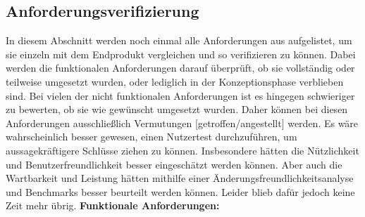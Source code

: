 \subsection{Anforderungsverifizierung}%
%
In diesem Abschnitt werden noch einmal alle Anforderungen aus  aufgelistet, um sie einzeln mit dem Endprodukt vergleichen und so verifizieren zu können. %
Dabei werden die funktionalen Anforderungen darauf überprüft, ob sie vollständig oder teilweise umgesetzt wurden, oder lediglich in der Konzeptionsphase verblieben sind. %
Bei vielen der nicht funktionalen Anforderungen ist es hingegen schwieriger zu bewerten, ob sie wie gewünscht umgesetzt wurden. Daher können bei diesen Anforderungen ausschließlich Vermutungen [getroffen/angestellt] werden. %
	Es wäre wahrscheinlich besser gewesen, einen Nutzertest durchzuführen, um aussagekräftigere Schlüsse ziehen zu können. Insbesondere hätten die Nützlichkeit und Benutzerfreundlichkeit besser eingeschätzt werden können. Aber auch die Wartbarkeit und Leistung hätten mithilfe einer Änderungsfreundlichkeitsanalyse und Benchmarks besser beurteilt werden können. Leider blieb dafür jedoch keine Zeit mehr übrig.%
\newline%
\myNewSection%
\textbf{Funktionale Anforderungen:}%
